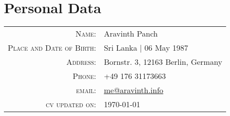 \section{Personal Data}
\begin{tabular}
	{rl} 
	\textsc{Name:} &  Aravinth Panch \\
	\textsc{Place and Date of Birth:} & Sri Lanka | 06 May 1987 \\
	\textsc{Address:} & Bornstr. 3, 12163 Berlin, Germany\\
	\textsc{Phone:} & +49 176 31173663\\
	\textsc{email:} & \href{mailto:me@aravinth.info}{me@aravinth.info} \\
	\textsc{cv updated on:} & \today\\
\end{tabular}

